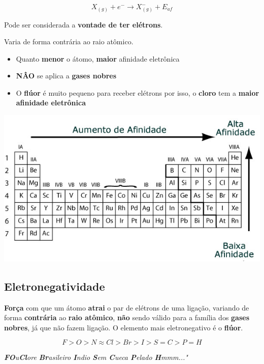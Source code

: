 \documentclass{article}
\begin{document}
\begin{equation}
    X_{(g)} + e^- \rightarrow X^-_{(g)} + E_{af}
\end{equation}

Pode ser considerada a \textbf{vontade de ter elétrons}.

Varia de forma contrária ao raio atômico.
\begin{itemize}
    \item Quanto \textbf{menor} o átomo, \textbf{maior} afinidade eletrônica
    \item \textbf{NÂO} se aplica a \textbf{gases nobres}
    \item O \textbf{flúor} é muito pequeno para receber elétrons por isso, o \textbf{cloro} tem a \textbf{maior afinidade eletrônica}
\end{itemize}

\begin{center}
    \includegraphics[width=1\textwidth]{tabela_periodica_afinidade_eletronica}
\end{center}

\subsection{Eletronegatividade}
\textbf{Força} com que um átomo \textbf{atrai} o par de elétrons de uma ligação, variando de forma \textbf{contrária} ao \textbf{raio atômico},
\textbf{não} sendo válido para a família dos \textbf{gases nobres}, já que não fazem ligação.
O elemento mais eletronegativo é o \textbf{flúor}.

\begin{equation}
    F > O > N \approx Cl > Br > I > S = C > P = H
\end{equation}

\begin{center}
    \textit{\textbf{FO}u\textbf{Cl}ore \textbf{Br}asileiro \textbf{I}ndio \textbf{S}em \textbf{C}ueca \textbf{P}elado \textbf{H}mmm..."}
\end{center}
\end{document}
